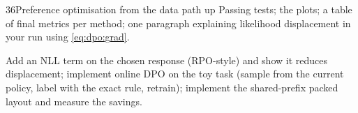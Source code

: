 \begin{labbox}{36}{Preference optimisation from the data path up}
Passing tests; the plots; a table of final metrics per method; one paragraph explaining
likelihood displacement in your run using \eqref{eq:dpo:grad}.

Add an NLL term on the chosen response (RPO-style) and show it reduces displacement; implement
online DPO on the toy task (sample from the current policy, label with the exact rule, retrain);
implement the shared-prefix packed layout and measure the savings.
\end{labbox}
